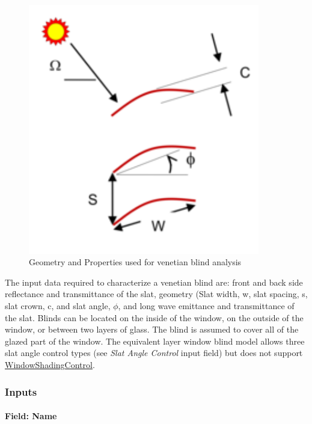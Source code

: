 \begin{figure}[hbtp] %
\centering
\includegraphics[width=0.9\textwidth, height=0.9\textheight, keepaspectratio=true]{media/image047.png}
\caption{Geometry and Properties used for venetian blind analysis \protect \label{fig:geometry-and-properties-used-for-venetian}}
\end{figure}

The input data required to characterize a venetian blind are: front and back side reflectance and transmittance of the slat, geometry (Slat width, w, slat spacing, s, slat crown, c, and slat angle, $\phi$, and long wave emittance and transmittance of the slat. Blinds can be located on the inside of the window, on the outside of the window, or between two layers of glass. The blind is assumed to cover all of the glazed part of the window.
The equivalent layer window blind model allows three slat angle control types (see \textit{Slat Angle Control} input field) but does not support \hyperref[windowpropertyshadingcontrol]{WindowShadingControl}.

\subsubsection{Inputs}\label{inputs-28-001}

\paragraph{Field: Name}\label{field-name-22-003}

